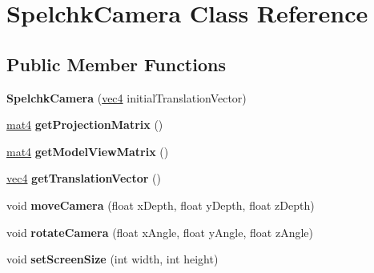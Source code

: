 \hypertarget{class_spelchk_camera}{\section{Spelchk\-Camera Class Reference}
\label{class_spelchk_camera}
}
\subsection*{Public Member Functions}
\begin{DoxyCompactItemize}
\item 
\hypertarget{class_spelchk_camera_a1d894472ef9e588ddeb56434e549cd0a}{{\bfseries Spelchk\-Camera} (\hyperlink{struct_angel_1_1vec4}{vec4} initial\-Translation\-Vector)}\label{class_spelchk_camera_a1d894472ef9e588ddeb56434e549cd0a}

\item 
\hypertarget{class_spelchk_camera_a2a9aa83f6e5d3d2371dd00ae162aef30}{\hyperlink{class_angel_1_1mat4}{mat4} {\bfseries get\-Projection\-Matrix} ()}\label{class_spelchk_camera_a2a9aa83f6e5d3d2371dd00ae162aef30}

\item 
\hypertarget{class_spelchk_camera_af702dfbd3c3719e4b738440bb2269922}{\hyperlink{class_angel_1_1mat4}{mat4} {\bfseries get\-Model\-View\-Matrix} ()}\label{class_spelchk_camera_af702dfbd3c3719e4b738440bb2269922}

\item 
\hypertarget{class_spelchk_camera_a4ad8fbfe69914453580c02406bffc501}{\hyperlink{struct_angel_1_1vec4}{vec4} {\bfseries get\-Translation\-Vector} ()}\label{class_spelchk_camera_a4ad8fbfe69914453580c02406bffc501}

\item 
\hypertarget{class_spelchk_camera_a1396d6aa2a3e85d9ed8b90c17751da41}{void {\bfseries move\-Camera} (float x\-Depth, float y\-Depth, float z\-Depth)}\label{class_spelchk_camera_a1396d6aa2a3e85d9ed8b90c17751da41}

\item 
\hypertarget{class_spelchk_camera_aa012e2d10f196ae007a8f8b4ac8471c3}{void {\bfseries rotate\-Camera} (float x\-Angle, float y\-Angle, float z\-Angle)}\label{class_spelchk_camera_aa012e2d10f196ae007a8f8b4ac8471c3}

\item 
\hypertarget{class_spelchk_camera_a24f5fe7d296bcd7ec9d70b25b6a92fe5}{void {\bfseries set\-Screen\-Size} (int width, int height)}\label{class_spelchk_camera_a24f5fe7d296bcd7ec9d70b25b6a92fe5}


\end{DoxyCompactItemize}
